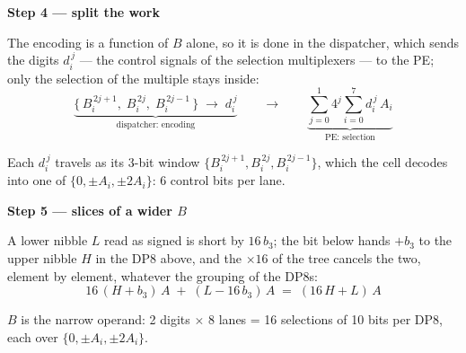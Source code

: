 \documentclass[fleqn]{article}
\begin{document}
\vspace{0.5em}

\noindent\textbf{Step 4 --- split the work}

\noindent The encoding is a function of $B$ alone, so it is done in the dispatcher, which
sends the digits $d_i^{\,j}$ --- the control signals of the selection multiplexers --- to the
PE; only the selection of the multiple stays inside:
\[
\underbrace{\bigl\{\, B_i^{\,2j+1},\; B_i^{\,2j},\; B_i^{\,2j-1} \,\bigr\}
  \;\longrightarrow\; d_i^{\,j}}_{\textstyle \text{dispatcher: encoding}}
\qquad\longrightarrow\qquad
\underbrace{\sum_{j=0}^{1} 4^{j} \sum_{i=0}^{7} d_i^{\,j} \, A_i}_{\textstyle \text{PE: selection}}
\]

\noindent Each $d_i^{\,j}$ travels as its 3-bit window $\{B_i^{\,2j+1}, B_i^{\,2j}, B_i^{\,2j-1}\}$,
which the cell decodes into one of $\{0, \pm A_i, \pm 2A_i\}$: 6 control bits per lane.

\vspace{0.5em}

\noindent\textbf{Step 5 --- slices of a wider $B$}

\noindent A lower nibble $L$ read as signed is short by $16\,b_3$; the bit below hands $+b_3$ to the
upper nibble $H$ in the DP8 above, and the $\times 16$ of the tree cancels the two,
element by element, whatever the grouping of the DP8s:
\[
16\,(H + b_3)\,A \;+\; (L - 16\,b_3)\,A \;=\; (16\,H + L)\,A
\]

\vspace{0.5em}

\noindent $B$ is the narrow operand: 2 digits $\times$ 8 lanes = 16 selections of
10 bits per DP8, each over $\{0, \pm A_i, \pm 2A_i\}$.
\end{document}
